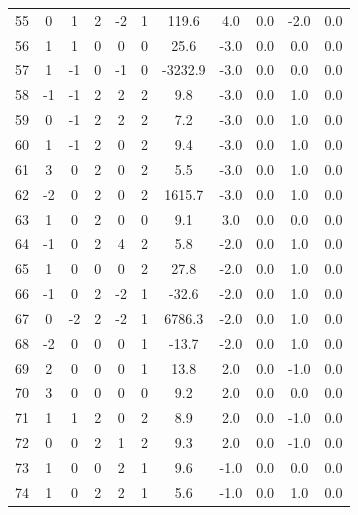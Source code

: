 \documentclass [12pt, a4paper] {article}
\begin{document}
\begin {center}
\begin {longtable}{| c | c c c c c | c | c | c | c | r |}
      55 & 0&   1&   2&  -2&   1&     119.6&       4.0&       0.0&      -2.0&       0.0 \\
      56 & 1&   1&   0&   0&   0&      25.6&      -3.0&       0.0&       0.0&       0.0 \\
      57 & 1&  -1&   0&  -1&   0&   -3232.9&      -3.0&       0.0&       0.0&       0.0 \\
      58 & -1&  -1&   2&   2&   2&       9.8&      -3.0&       0.0&       1.0&       0.0 \\
      59 & 0&  -1&   2&   2&   2&       7.2&      -3.0&       0.0&       1.0&       0.0 \\
      60 & 1&  -1&   2&   0&   2&       9.4&      -3.0&       0.0&       1.0&       0.0 \\
      61 & 3&   0&   2&   0&   2&       5.5&      -3.0&       0.0&       1.0&       0.0 \\
      62 & -2&   0&   2&   0&   2&    1615.7&      -3.0&       0.0&       1.0&       0.0 \\
      63 & 1&   0&   2&   0&   0&       9.1&       3.0&       0.0&       0.0&       0.0 \\
      64 & -1&   0&   2&   4&   2&       5.8&      -2.0&       0.0&       1.0&       0.0 \\
      65 & 1&   0&   0&   0&   2&      27.8&      -2.0&       0.0&       1.0&       0.0 \\
      66 & -1&   0&   2&  -2&   1&     -32.6&      -2.0&       0.0&       1.0&       0.0 \\
      67 & 0&  -2&   2&  -2&   1&    6786.3&      -2.0&       0.0&       1.0&       0.0 \\
      68 & -2&   0&   0&   0&   1&     -13.7&      -2.0&       0.0&       1.0&       0.0 \\
      69 & 2&   0&   0&   0&   1&      13.8&       2.0&       0.0&      -1.0&       0.0 \\
      70 & 3&   0&   0&   0&   0&       9.2&       2.0&       0.0&       0.0&       0.0 \\
      71 & 1&   1&   2&   0&   2&       8.9&       2.0&       0.0&      -1.0&       0.0 \\
      72 & 0&   0&   2&   1&   2&       9.3&       2.0&       0.0&      -1.0&       0.0 \\
      73 & 1&   0&   0&   2&   1&       9.6&      -1.0&       0.0&       0.0&       0.0 \\
      74 & 1&   0&   2&   2&   1&       5.6&      -1.0&       0.0&       1.0&       0.0 \\

\end{longtable}
\end{center}
\end{document}

